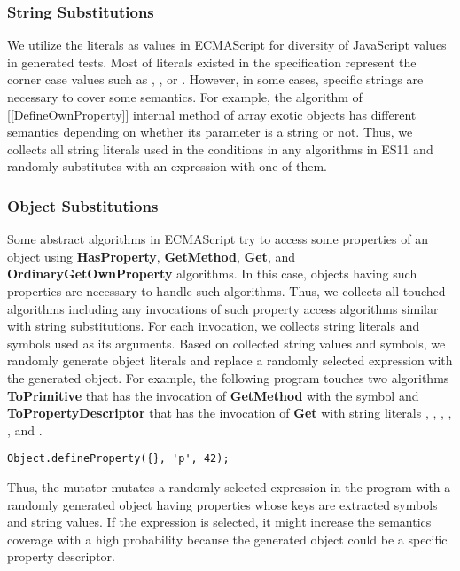 \subsubsection{String Substitutions}
We utilize the literals as values in ECMAScript for diversity of JavaScript
values in generated tests.  Most of literals existed in the specification
represent the corner case values such as , , or
.  However, in some cases, specific strings are necessary to cover
some semantics.  For example, the algorithm of [[DefineOwnProperty]] internal
method of array exotic objects has different semantics depending on whether its
parameter  is a string  or not.  Thus, we collects all
string literals used in the conditions in any algorithms in ES11 and randomly
substitutes with an expression with one of them.


\subsubsection{Object Substitutions}
Some abstract algorithms in ECMAScript try to access some properties of an
object using \textbf{HasProperty}, \textbf{GetMethod}, \textbf{Get}, and
\textbf{OrdinaryGetOwnProperty} algorithms.  In this case, objects having such
properties are necessary to handle such algorithms.  Thus, we collects all
touched algorithms including any invocations of such property access algorithms
similar with string substitutions.  For each invocation, we collects string
literals and symbols used as its arguments.  Based on collected string values
and symbols, we randomly generate object literals and replace a randomly
selected expression with the generated object.  For example, the following
program touches two algorithms \textbf{ToPrimitive} that has the invocation of
\textbf{GetMethod} with the symbol  and
\textbf{ToPropertyDescriptor} that has the invocation of \textbf{Get} with
string literals , , , ,
, and .
\begin{lstlisting}[style=myJSstyle]
Object.defineProperty({}, 'p', 42);
\end{lstlisting}
Thus, the mutator mutates a randomly selected expression in the program with a
randomly generated object having properties whose keys are extracted symbols and
string values.  If the expression  is selected, it might increase the
semantics coverage with a high probability because the generated object could be
a specific property descriptor.


